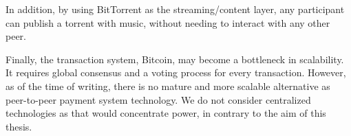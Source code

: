 In addition, by using BitTorrent as the streaming/content layer, any participant can publish a torrent with music, without needing to interact with any other peer. 

Finally, the transaction system, Bitcoin, may become a bottleneck in scalability. It requires global consensus and a voting process for every transaction. However, as of the time of writing, there is no mature and more scalable alternative as peer-to-peer payment system technology. We do not consider centralized technologies as that would concentrate power, in contrary to the aim of this thesis.